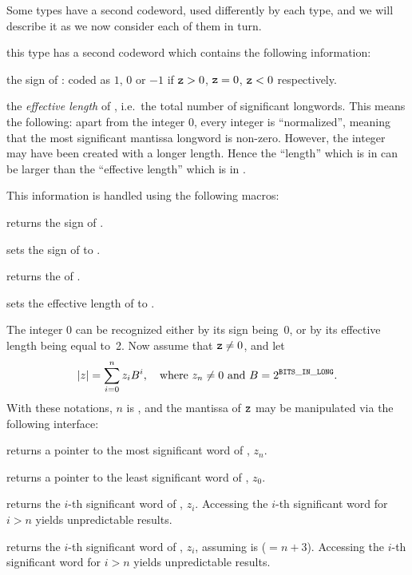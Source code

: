 Some types have a second codeword, used differently by each type, and
we will describe it as we now consider each of them in turn.

this type has a second codeword  which
contains the following information:

the sign of : coded as $1$, $0$ or $-1$ if ${\tt z} > 0$, ${\tt z} = 0$,
${\tt z} < 0$ respectively.

the \emph{effective length} of , i.e.~the total number of significant
longwords. This means the following: apart from the integer 0, every integer
is ``normalized'', meaning that the most significant mantissa longword is
non-zero. However, the integer may have been created with a longer length.
Hence the ``length'' which is in  can be larger than the
``effective length'' which is in .

\noindent This information is handled using the following macros:

 returns the sign of .

 sets the sign of  to .

 returns the  of .

 sets the effective length
of  to .

The integer 0 can be recognized either by its sign being~0, or by its
effective length being equal to~2. Now assume that ${\tt z} \ne 0$, and let
$$ |z| = \sum_{i = 0}^n z_i B^i,
  \quad{\rm where}~z_n\ne 0~{\rm and}~B = 2^{{\tt BITS\_IN\_LONG}}.
$$
With these notations, $n$ is , and the mantissa of
${\tt z}$ may be manipulated via the following interface:

 returns a pointer to the most significant word of
, $z_n$.

 returns a pointer to the least significant word of
, $z_0$.

 returns the $i$-th significant word of
, $z_i$. Accessing the $i$-th significant word for $i > n$
yields unpredictable results.

 returns the $i$-th significant
word of , $z_i$, assuming  is  ($= n + 3$).
Accessing the $i$-th significant word for $i > n$ yields unpredictable
results.

